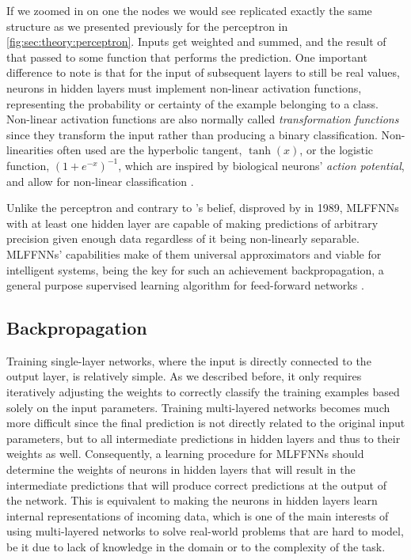 If we zoomed in on one the nodes we would see replicated exactly the same structure as we presented previously for the perceptron in \autoref{fig:sec:theory:perceptron}.
Inputs get weighted and summed, and the result of that passed to some function that performs the prediction.
One important difference to note is that for the input of subsequent layers to still be real values, neurons in hidden layers must implement non-linear activation functions, representing the probability or certainty of the example belonging to a class.
Non-linear activation functions are also normally called \emph{transformation functions} since they transform the input rather than producing a binary classification.
Non-linearities often used are the hyperbolic tangent, $\tanh(x)$, or the logistic function, $(1+e^{-x})^{-1}$, which are inspired by biological neurons' \emph{action potential}, and allow for non-linear classification \cite{Thorpe1989}.

Unlike the perceptron and contrary to \citeauthor{Minsky1969}'s belief, disproved by \citet{Hornik1989} in 1989, MLFFNNs with at least one hidden layer are capable of making predictions of arbitrary precision given enough data regardless of it being non-linearly separable.
MLFFNNs' capabilities make of them universal approximators and viable for intelligent systems, being the key for such an achievement backpropagation, a general purpose supervised learning algorithm for feed-forward networks \cite{Rumelhart1986}.


\subsection{Backpropagation}
\label{sec:theory:mlffnn:backpropagation}

Training single-layer networks, where the input is directly connected to the output layer, is relatively simple.
As we described before, it only requires iteratively adjusting the weights to correctly classify the training examples based solely on the input parameters.
Training multi-layered networks becomes much more difficult since the final prediction is not directly related to the original input parameters, but to all intermediate predictions in hidden layers and thus to their weights as well.
Consequently, a learning procedure for MLFFNNs should determine the weights of neurons in hidden layers that will result in the intermediate predictions that will produce correct predictions at the output of the network.
This is equivalent to making the neurons in hidden layers learn internal representations of incoming data, which is one of the main interests of using multi-layered networks to solve real-world problems that are hard to model, be it due to lack of knowledge in the domain or to the complexity of the task.

